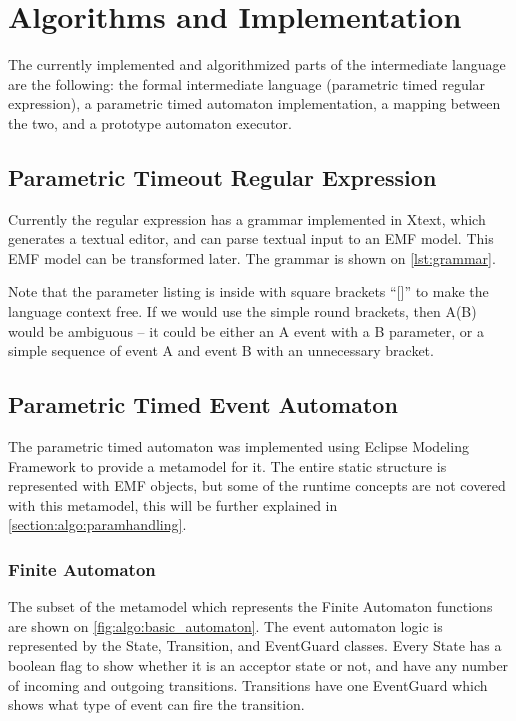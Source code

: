 \chapter{Algorithms and Implementation}

The currently implemented and algorithmized parts of the intermediate language are the following: the formal intermediate language (parametric timed regular expression), a parametric timed automaton implementation, a mapping between the two, and a prototype automaton executor.

\section{Parametric Timeout Regular Expression}

Currently the regular expression has a grammar implemented in Xtext, which generates a textual editor, and can parse textual input to an EMF model. This EMF model can be transformed later. 
The grammar is shown on \cref{lst:grammar}.

Note that the parameter listing is inside with square brackets ``[]'' to make the language context free. If we would use the simple round brackets, then A(B) would be ambiguous -- it could be either an A event with a B parameter, or a simple sequence of event A and event B with an unnecessary bracket.

\section{Parametric Timed Event Automaton}

The parametric timed automaton was implemented using Eclipse Modeling Framework to provide a metamodel for it. The entire static structure is represented with EMF objects, but some of the runtime concepts are not covered with this metamodel, this will be further explained in \cref{section:algo:paramhandling}.

\subsection{Finite Automaton}

The subset of the metamodel which represents the Finite Automaton functions are shown on \cref{fig:algo:basic_automaton}.
The event automaton logic is represented by the State, Transition, and EventGuard classes.
Every State has a boolean flag to show whether it is an acceptor state or not, and have any number of incoming and outgoing transitions.
Transitions have one EventGuard which shows what type of event can fire the transition. 

